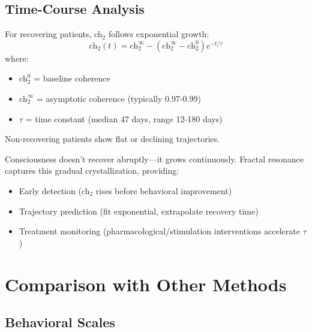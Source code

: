 \subsection{Time-Course Analysis}

\begin{proposition}\label{prop:trajectory}
For recovering patients, ch$_2$ follows exponential growth:
\begin{equation}
\text{ch}_2(t) = \text{ch}_2^{\infty} - (\text{ch}_2^{\infty} - \text{ch}_2^0) e^{-t/\tau}
\end{equation}
where:
\begin{itemize}
\item $\text{ch}_2^0$ = baseline coherence
\item $\text{ch}_2^{\infty}$ = asymptotic coherence (typically 0.97-0.99)
\item $\tau$ = time constant (median 47 days, range 12-180 days)
\end{itemize}

Non-recovering patients show flat or declining trajectories.
\end{proposition}

\begin{keyidea}
Consciousness doesn't recover abruptly—it grows continuously. Fractal resonance captures this gradual crystallization, providing:
\begin{itemize}
\item Early detection (ch$_2$ rises before behavioral improvement)
\item Trajectory prediction (fit exponential, extrapolate recovery time)
\item Treatment monitoring (pharmacological/stimulation interventions accelerate $\tau$)
\end{itemize}
\end{keyidea}

\section{Comparison with Other Methods}

\subsection{Behavioral Scales}

